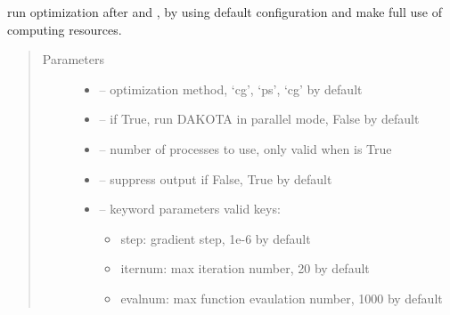 \documentclass[letterpaper,10pt,english]{sphinxmanual}
\begin{document}
\begin{fulllineitems}
\begin{fulllineitems}
\begin{quote}
\begin{description}
\begin{itemize}
\end{itemize}

\end{description}\end{quote}

\end{fulllineitems}


\begin{fulllineitems}
\label{\detokenize{src/apidocs/dakopt:genopt.dakopt.DakotaOC.simple_run}}
run optimization after  and ,
by using default configuration and make full use of computing resources.
\begin{quote}\begin{description}
\item[{Parameters}] \leavevmode\begin{itemize}
\item {} 
 -- optimization method, `cg', `ps', `cg' by default

\item {} 
 -- if True, run DAKOTA in parallel mode, False by default

\item {} 
 -- number of processes to use, only valid when  is True

\item {} 
 -- suppress output if False, True by default

\item {} 
 -- 
keyword parameters
valid keys:
\begin{itemize}
\item {} 
step: gradient step, 1e-6 by default

\item {} 
iternum: max iteration number, 20 by default

\item {} 
evalnum: max function evaulation number, 1000 by default

\end{itemize}


\end{itemize}

\end{description}\end{quote}

\end{fulllineitems}


\begin{fulllineitems}
\label{\detokenize{src/apidocs/dakopt:genopt.dakopt.DakotaOC.vcors}}
\end{fulllineitems}


\end{fulllineitems}
\end{document}

